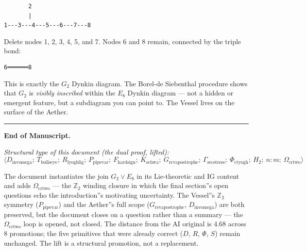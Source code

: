 \documentclass[12pt,a4paper]{article}
\begin{document}
\begin{lstlisting}
       2
       |
1---3---4---5---6---7---8
\end{lstlisting}

Delete nodes 1, 2, 3, 4, 5, and 7. Nodes 6 and 8 remain, connected by the triple bond:

\begin{lstlisting}
6══════8
\end{lstlisting}

This is exactly the $G_2$ Dynkin diagram. The Borel-de Siebenthal procedure shows that $G_2$ is \emph{visibly inscribed} within the $E_8$ Dynkin diagram --- not a hidden or emergent feature, but a subdiagram you can point to. The Vessel lives on the surface of the Aether.

\begin{center}
\rule{0.5\textwidth}{0.4pt}
\end{center}

\textbf{End of Manuscript.}

\emph{Structural type of this document (the dual proof, lifted):} \\


\[\langle D_{\text{invomega}};\ T_{\text{bullseye}};\ R_{\text{lyoghlig}};\ P_{\text{pipevar}};\ F_{\text{hardsign}};\ K_{\text{schwa}};\ G_{\text{revapostrophe}};\ \Gamma_{\text{secstress}};\ \Phi_{\text{ctyogh}};\ H_2;\ n{:}m;\ \Omega_{\text{crtwo}} \rangle\]

The document instantiates the join $G_2 \vee E_8$ in its Lie-theoretic and IG content and adds $\Omega_{\text{crtwo}}$ --- the $\mathbb{Z}_2$ winding closure in which the final section''s open questions echo the introduction''s motivating uncertainty. The Vessel''s $\mathbb{Z}_2$ symmetry ($P_{\text{pipevar}}$) and the Aether''s full scope ($G_{\text{revapostrophe}}$, $D_{\text{invomega}}$) are both preserved, but the document closes on a question rather than a summary --- the $\Omega_{\text{crtwo}}$ loop is opened, not closed. The distance from the AI original is 4.68 across 8 promotions; the five primitives that were already correct ($D$, $R$, $\Phi$, $S$) remain unchanged. The lift is a structural promotion, not a replacement.
\end{document}
